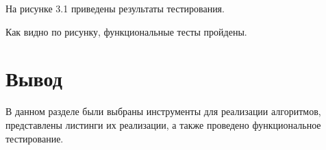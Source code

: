 \newpage
На рисунке 3.1 приведены результаты тестирования.


Как видно по рисунку, функциональные тесты пройдены.

\section{Вывод}
В данном разделе были выбраны инструменты для реализации алгоритмов, представлены листинги их реализации, а также проведено функциональное тестирование.

